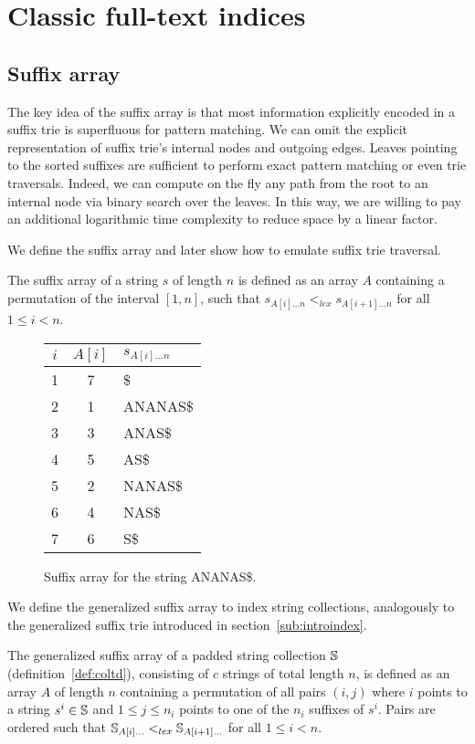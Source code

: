 \section{Classic full-text indices}

\subsection{Suffix array}

The key idea of the suffix array \citep{Manber1990} is that most information explicitly encoded in a suffix trie is superfluous for pattern matching.
We can omit the explicit representation of suffix trie's internal nodes and outgoing edges.
Leaves pointing to the sorted suffixes are sufficient to perform exact pattern matching or even trie traversals.
Indeed, we can compute on the fly any path from the root to an internal node via binary search over the leaves.
In this way, we are willing to pay an additional logarithmic time complexity to reduce space by a linear factor.

We define the suffix array and later show how to emulate suffix trie traversal.
\begin{definition}
The suffix array of a string $s$ of length $n$ is defined as an array $A$ containing a permutation of the interval $[1,n]$, such that $s_{A[i] \dots n} <_{lex} s_{A[i+1] \dots n}$ for all $1 \leq i < n$.
\end{definition}

\begin{figure}[h]
\begin{center}
\caption[Example of suffix array]{Suffix array for the string {\ttfamily ANANAS\$}.}
\label{fig:sa}
\ttfamily
\begin{tabular}{ccl}
$i$ & $A[i]$ & $s_{A[i]\dots n}$\\
\midrule
1 & 7 & \$\\
2 & 1 & ANANAS\$\\
3 & 3 & ANAS\$\\
4 & 5 & AS\$\\
5 & 2 & NANAS\$\\
6 & 4 & NAS\$\\
7 & 6 & S\$\\
\end{tabular}
\end{center}
\end{figure}

We define the generalized suffix array to index string collections, analogously to the generalized suffix trie introduced in section~\ref{sub:introindex}.
\begin{definition}
The generalized suffix array of a padded string collection $\mathbb {S}$ (definition~\ref{def:coltd}), consisting of $c$ strings of total length $n$, is defined as an array $A$ of length $n$ containing a permutation of all pairs $(i,j)$ where $i$ points to a string $s^i \in \mathbb {S}$ and $1 \leq j \leq n_i$ points to one of the $n_i$ suffixes of $s^i$.
Pairs are ordered such that $\mathbb {S}_{A[i] \dots} <_{lex} \mathbb {S}_{A[i+1] \dots}$ for all $1 \leq i < n$.
\end{definition}

